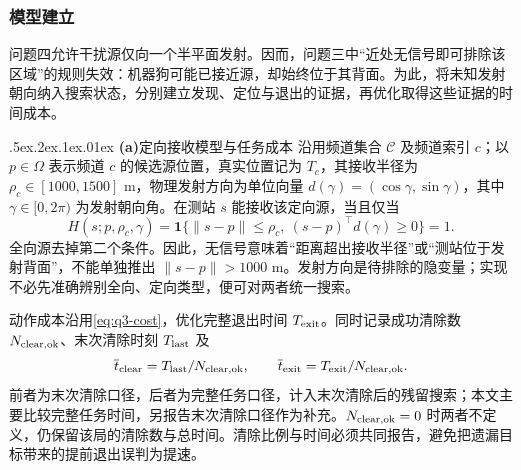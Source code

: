 \label{sec:q4}

\begingroup
\makeatletter
\renewcommand\paragraph{\@startsection{paragraph}{4}{\z@}%
  {.5ex\@plus.2ex\@minus.1ex}{.01ex}%
  {\normalfont\heiti\normalsize}}
\makeatother

\subsubsection{模型建立}
问题四允许干扰源仅向一个半平面发射。因而，问题三中“近处无信号即可排除该区域”的规则失效：机器狗可能已接近源，却始终位于其背面。为此，将未知发射朝向纳入搜索状态，分别建立发现、定位与退出的证据，再优化取得这些证据的时间成本。

\paragraph{\textbf{(a)}\hspace{0.2em}定向接收模型与任务成本}
沿用频道集合 $\mathcal C$ 及频道索引 $c$；以 $p\in\Omega$ 表示频道 $c$ 的候选源位置，真实位置记为 $T_c$，其接收半径为 $\rho_c\in[1000,1500]$ m，物理发射方向为单位向量 $d(\gamma)=(\cos\gamma,\sin\gamma)$，其中 $\gamma\in[0,2\pi)$ 为发射朝向角。在测站 $s$ 能接收该定向源，当且仅当
\begin{equation}\label{eq:q4-reception}
 H(s;p,\rho_c,\gamma)=\mathbf1\{\|s-p\|\le \rho_c,\ (s-p)^\top d(\gamma)\ge0\}=1.
\end{equation}
全向源去掉第二个条件。因此，无信号意味着“距离超出接收半径”或“测站位于发射背面”，不能单独推出 $\|s-p\|>1000$ m。发射方向是待排除的隐变量；实现不必先准确辨别全向、定向类型，便可对两者统一搜索。

动作成本沿用\cref{eq:q3-cost}，优化完整退出时间 $T_{\rm exit}$。同时记录成功清除数 $N_{\rm clear,ok}$、末次清除时刻 $T_{\rm last}$ 及
\begin{equation}\label{eq:q4-metrics}
 \overline t_{\rm clear}=T_{\rm last}/N_{\rm clear,ok},\qquad
 \overline t_{\rm exit}=T_{\rm exit}/N_{\rm clear,ok}.
\end{equation}
前者为末次清除口径，后者为完整任务口径，计入末次清除后的残留搜索；本文主要比较完整任务时间，另报告末次清除口径作为补充。$N_{\rm clear,ok}=0$ 时两者不定义，仍保留该局的清除数与总时间。清除比例与时间必须共同报告，避免把遗漏目标带来的提前退出误判为提速。

